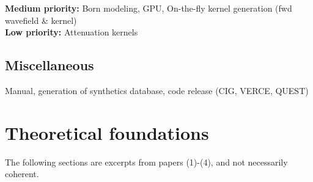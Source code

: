 \documentclass[11pt,letter,fleqn,english,notitlepage]{article}
\begin{document}
\noindent\textbf{Medium priority:}
Born modeling, GPU, On-the-fly kernel generation (fwd wavefield \&
kernel)\\

\noindent\textbf{Low priority:}
Attenuation kernels

\subsection{Miscellaneous}
Manual, generation of synthetics database, code release (CIG, VERCE, QUEST)


\newpage
\section{Theoretical foundations}
The following sections are excerpts from papers (1)-(4), and not necessarily coherent.
\end{document}
